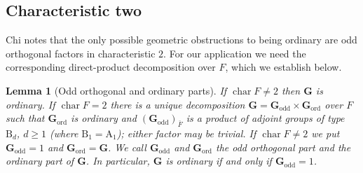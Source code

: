\documentclass[11pt,reqno]{amsart}
\numberwithin{equation}{section}
\theoremstyle{plain}
\newtheorem{lemma}[theorem]{Lemma}
\theoremstyle{definition}
\theoremstyle{remark}
\theoremstyle{plain}
\newcommand{\bG}{\mathbf{G}}     %
\newcommand{\Godd}{\bG_{\mathrm{odd}}}
\newcommand{\Gord}{\bG_{\mathrm{ord}}}
\DeclareMathOperator{\chr}{char}   %
\newcommand{\ordinary}{ordinary}
\newcommand{\oddorth}{odd orthogonal}
\newcommand{\Oddorth}{Odd orthogonal}
\begin{document}
\subsection{Characteristic two}

Chi \cite[Remark~2.5]{Chi26} notes that the only possible geometric
obstructions to being \ordinary{} are odd orthogonal factors
in characteristic $2$. For our application we need the corresponding
direct-product decomposition over $F$, which we establish below.

\begin{lemma}[\Oddorth{} and \ordinary{} parts]\label{lem:split}
If $\chr F\ne2$ then $\bG$ is \ordinary{}. If
$\chr F=2$ there is a unique decomposition $\bG=\Godd\times\Gord$ over $F$
such that $\Gord$ is \ordinary{} and $(\Godd)_{\bar F}$ is a
product of adjoint groups of type $\mathrm B_d$, $d\ge1$ (where
$\mathrm B_1=\mathrm A_1$); either factor may be trivial. If $\chr F\ne2$
we put $\Godd=1$ and $\Gord=\bG$. We call $\Godd$ and $\Gord$ the
\emph{\oddorth{} part} and the \emph{\ordinary{} part} of $\bG$. In
particular, $\bG$ is \ordinary{} if and only if $\Godd=1$.
\end{lemma}
\end{document}
